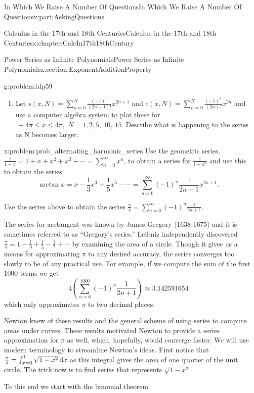 \documentclass[oneside,10pt,]{book}
\numberwithin{equation}{section}
\newcommand{\dx}[1]{\,{\rm d}#1}
\begin{document}
\begin{partptx}{In Which We Raise A Number Of Questions}{}{In Which We Raise A Number Of Questions}{}{}{x:part:AskingQuestions}
\begin{chapterptx}{Calculus in the 17th and 18th Centuries}{}{Calculus in the 17th and 18th Centuries}{}{}{x:chapter:CalcIn17th18thCentury}
\begin{sectionptx}{Power Series as Infinite Polynomials}{}{Power Series as Infinite Polynomials}{}{}{x:section:ExponentAdditionProperty}
\begin{problem}{}{g:problem:idp59}
\begin{enumerate}[font=\bfseries,label=(\alph*),ref=\alph*]
\item{}Let \(s(x,N)=\sum_{n=0}^N\frac{\left(-1\right)^n}{\left(2n+1\right)!}x^{2n+1}\) and \(c(x,N)=\sum_{n=0}^N\frac{\left(-1\right)^n}{\left(2n\right)!}x^{2n}\) and use a computer algebra system to plot these for\(\,-4\pi\leq x\leq 4\pi,\,\,N=1,2,5,\,10,\,15\). Describe what is happening to the series as N becomes larger.%
\end{enumerate}
\end{problem}
\begin{problem}{}{x:problem:prob_alternating_harmonic_series}%
Use the geometric series, \(\frac{1}{1-x}=1+x+x^2+x^3+\cdots=\sum_{n=0}^\infty x^n\), to obtain a series for \(\frac{1}{1+x^2}\) and use this to obtain the series%
\begin{equation*}
\arctan x=x-\frac{1}{3}x^3+\frac{1}{5}x^5-\cdots=\sum_{n=0}^\infty(-1)^n \frac{1}{2n+1}x^{2n+1}\text{.}
\end{equation*}
%
\par
Use the series above to obtain the series \(\frac{\pi}{4}=\sum_{n=0}^\infty(-1)^n\frac{1}{2n+1}\).%
\end{problem}
The series for arctangent was known by James Gregory (1638-1675) and it is sometimes referred to as ``Gregory's series.'' Leibniz independently discovered \(\frac{\pi}{4}=1-\frac{1}{3}+\frac{1}{5}-\frac{1}{7}+\cdots\) by examining the area of a circle.  Though it gives us a means for approximating \(\pi\) to any desired accuracy, the series converges too slowly to be of any practical use.  For example, if we compute the sum of the first \(1000\) terms we get%
\begin{equation*}
4\left(\sum_{n=0}^{1000}(-1)^n\frac{1}{2n+1}\right)\approx 3.142591654
\end{equation*}
which only approximates \(\pi\) to two decimal places.%
\par
Newton  knew of these results and the general scheme of using series to compute areas under curves. These results motivated Newton to provide a series approximation for \(\pi\) as well, which, hopefully, would converge faster. We will use modern terminology to streamline Newton's ideas. First notice that \(\frac{\pi}{4}=\int_{x=0}^1\sqrt{1-x^2}\dx{ x}\) as this integral gives the area of one quarter of the unit circle. The trick now is to find series that represents \(\sqrt{1-x^2}\).%
\par
To this end we start with the binomial theorem%
\begin{equation*}

\end{equation*}
\end{sectionptx}
\end{chapterptx}
\end{partptx}
\end{document}
